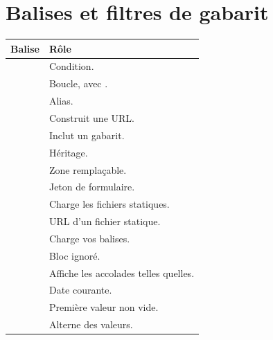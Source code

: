 \section{Balises et filtres de gabarit}

\begin{longtable}{L{4.6cm} L{10.6cm}}
\toprule
\textbf{Balise} & \textbf{Rôle} \\
\midrule
\endhead
{} & Condition. \\
 & Boucle, avec . \\
 & Alias. \\
 & Construit une URL. \\
 & Inclut un gabarit. \\
 & Héritage. \\
 & Zone remplaçable. \\
 & Jeton de formulaire. \\
 & Charge les fichiers statiques. \\
 & URL d'un fichier statique. \\
 & Charge vos balises. \\
 & Bloc ignoré. \\
 & Affiche les accolades telles quelles. \\
 & Date courante. \\
 & Première valeur non vide. \\
 & Alterne des valeurs. \\
\bottomrule
\end{longtable}

